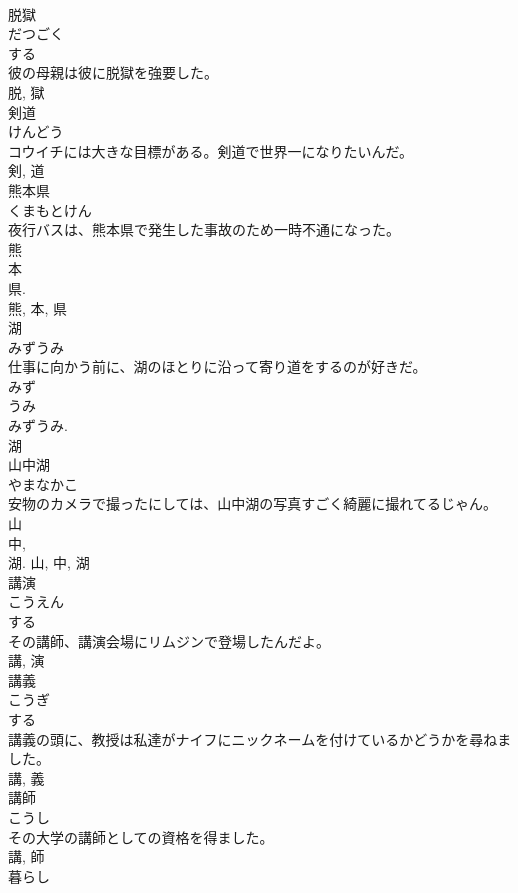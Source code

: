 \documentclass[8pt]{extreport}
\begin{document}
\begin{CJK}{UTF8}{min}
\\	脱獄	
\\	だつごく	
\\	する 
\\	彼の母親は彼に脱獄を強要した。	
\\	脱, 獄	
\\	剣道	
\\	けんどう	
\\	コウイチには大きな目標がある。剣道で世界一になりたいんだ。	
\\	剣, 道	
\\	熊本県	
\\	くまもとけん	
\\	夜行バスは、熊本県で発生した事故のため一時不通になった。	
\\	熊
\\	本 
\\	県.
\\	熊, 本, 県	
\\	湖	
\\	みずうみ	
\\	仕事に向かう前に、湖のほとりに沿って寄り道をするのが好きだ。	
\\	みず 
\\	うみ 
\\	みずうみ.
\\	湖	
\\	山中湖	
\\	やまなかこ	
\\	安物のカメラで撮ったにしては、山中湖の写真すごく綺麗に撮れてるじゃん。	
\\	山 
\\	中, 
\\	湖.	山, 中, 湖	
\\	講演	
\\	こうえん	
\\	する 
\\	その講師、講演会場にリムジンで登場したんだよ。	
\\	講, 演	
\\	講義	
\\	こうぎ	
\\	する 
\\	講義の頭に、教授は私達がナイフにニックネームを付けているかどうかを尋ねました。	
\\	講, 義	
\\	講師	
\\	こうし	
\\	その大学の講師としての資格を得ました。	
\\	講, 師	
\\	暮らし	

\end{CJK}
\end{document}
